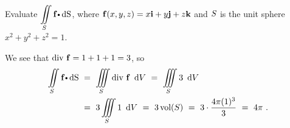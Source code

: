   \begin{exa}
 Evaluate $\diint\limits_{\superficie} \Dotprod{\vector{f}}{\d \S}$, where $\mathbf{ f}(x,y,z) = x\mathbf{ i} +
  y\mathbf{ j} + z\mathbf{ k}$ and $S$ is the unit sphere $x^2 + y^2 + z^2 = 1$.\vspace{1mm}
\end{exa}
\begin{solu}We see that $\text{div}~\mathbf{ f} = 1+1+1=3$, so
 \begin{align*}
  \diint\limits_{\superficie} \Dotprod{\vector{f}}{\d \S} ~&=~
  \iiint\limits_{S} \text{div}~\vector{f} ~\d V
  ~=~ \iiint\limits_{S} 3 ~\d V\\
  &=~ 3 \iiint\limits_{S} 1 ~\d V
  ~=~ 3\,\text{vol}(S) ~=~ 3\cdot \dfrac{4\pi (1)^3}{3} ~=~ 4\pi ~.
 \end{align*}
\end{solu}


